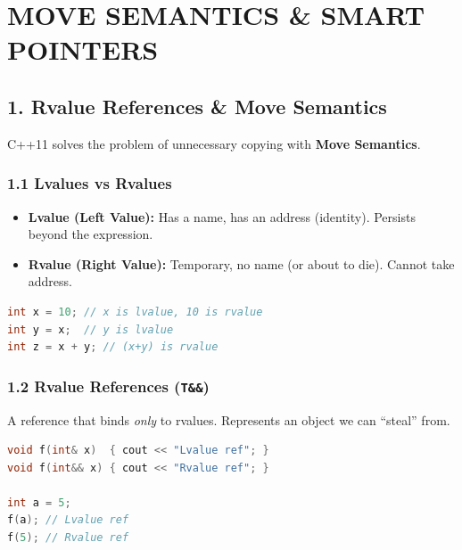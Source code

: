 \hypertarget{move-semantics-smart-pointers}{%
\chapter{MOVE SEMANTICS \& SMART
POINTERS}\label{move-semantics-smart-pointers}}

\hypertarget{rvalue-references-move-semantics}{%
\section{1. Rvalue References \& Move
Semantics}\label{rvalue-references-move-semantics}}

C++11 solves the problem of unnecessary copying with \textbf{Move
Semantics}.

\hypertarget{lvalues-vs-rvalues}{%
\subsection{1.1 Lvalues vs Rvalues}\label{lvalues-vs-rvalues}}

\begin{itemize}
\tightlist
\item
  \textbf{Lvalue (Left Value):} Has a name, has an address (identity).
  Persists beyond the expression.
\item
  \textbf{Rvalue (Right Value):} Temporary, no name (or about to die).
  Cannot take address.
\end{itemize}

\begin{lstlisting}[language={C++}]
int x = 10; // x is lvalue, 10 is rvalue
int y = x;  // y is lvalue
int z = x + y; // (x+y) is rvalue
\end{lstlisting}

\hypertarget{rvalue-references-t}{%
\subsection{\texorpdfstring{1.2 Rvalue References
(\texttt{T\&\&})}{1.2 Rvalue References (T\&\&)}}\label{rvalue-references-t}}

A reference that binds \emph{only} to rvalues. Represents an object we
can ``steal'' from.

\begin{lstlisting}[language={C++}]
void f(int& x)  { cout << "Lvalue ref"; }
void f(int&& x) { cout << "Rvalue ref"; }

int a = 5;
f(a); // Lvalue ref
f(5); // Rvalue ref
\end{lstlisting}

